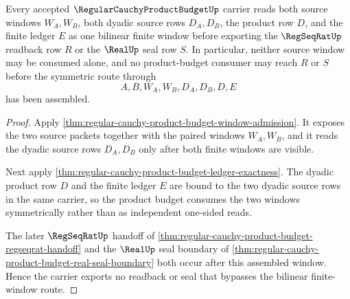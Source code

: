 \begin{theorem}
\label{thm:regular-cauchy-product-budget-bilinear-window}
Every accepted $\RegularCauchyProductBudgetUp$ carrier reads both source windows $W_A,W_B$, both dyadic source rows $D_A,D_B$, the product row $D$, and the finite ledger $E$ as one bilinear finite window before exporting the $\RegSeqRatUp$ readback row $R$ or the $\RealUp$ seal row $S$. In particular, neither source window may be consumed alone, and no product-budget consumer may reach $R$ or $S$ before the symmetric route through
$$
A,B,W_A,W_B,D_A,D_B,D,E
$$
has been assembled.
\end{theorem}
\begin{proof}
Apply \autoref{thm:regular-cauchy-product-budget-window-admission}. It exposes the two source packets together with the paired windows $W_A,W_B$, and it reads the dyadic source rows $D_A,D_B$ only after both finite windows are visible.

Next apply \autoref{thm:regular-cauchy-product-budget-ledger-exactness}. The dyadic product row $D$ and the finite ledger $E$ are bound to the two dyadic source rows in the same carrier, so the product budget consumes the two windows symmetrically rather than as independent one-sided reads.

The later $\RegSeqRatUp$ handoff of \autoref{thm:regular-cauchy-product-budget-regseqrat-handoff} and the $\RealUp$ seal boundary of \autoref{thm:regular-cauchy-product-budget-real-seal-boundary} both occur after this assembled window. Hence the carrier exports no readback or seal that bypasses the bilinear finite-window route.
\end{proof}

